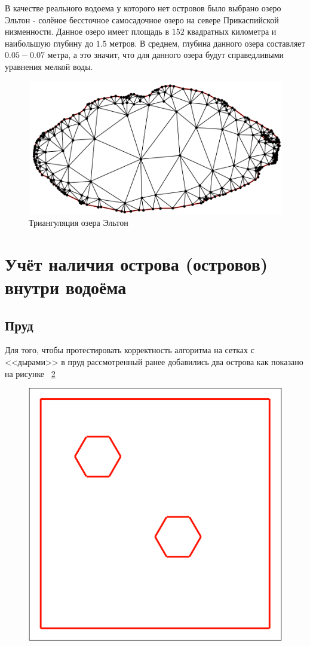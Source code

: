 \documentclass[14pt]{extreport}
\begin{document}
В качестве реального водоема у которого нет островов было выбрано озеро Эльтон - солёное бессточное самосадочное озеро на севере Прикаспийской низменности. Данное озеро имеет площадь в $152$ квадратных километра и наибольшую глубину до $1.5$ метров. В среднем, глубина данного озера составляет $0.05 - 0.07$ метра, а это значит, что для данного озера будут справедливыми уравнения мелкой воды.

\begin{figure}[H]
\centerline{
\includegraphics[width=1.0\linewidth]{images/ex2/mesh}}
\caption{Триангуляция озера Эльтон}
\label{img:ex2:mesh}
\end{figure}


\section{Учёт наличия острова (островов) внутри водоёма}


\subsection{Пруд}
Для того, чтобы протестировать корректность алгоритма на сетках с <<дырами>> в пруд рассмотренный ранее добавились два острова как показано на рисунке ~\ref{img:ex3:contour}

\begin{figure}[H]
\centerline{
\includegraphics[width=0.5\linewidth]{images/ex3/contour}}
\caption{}
\label{img:ex3:contour}
\end{figure}
\end{document}
